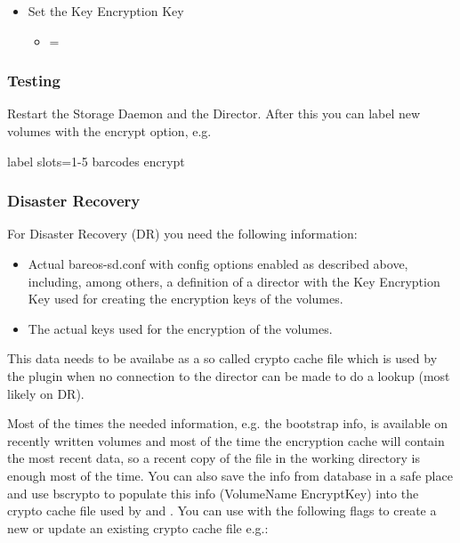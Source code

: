 \begin{itemize}
 \item Set the Key Encryption Key
   \begin{itemize}
   \item {} = 
   \end{itemize}
\end{itemize}

\subsubsection{Testing}

Restart the Storage Daemon and the Director.
After this you can label new volumes with the encrypt option, e.g.
\begin{bconfig}{}
label slots=1-5 barcodes encrypt
\end{bconfig}


\subsubsection{Disaster Recovery}

For Disaster Recovery (DR) you need the following information:

\begin{itemize}
 \item Actual bareos-sd.conf with config options enabled as described above, including, among others, a definition of a director with the Key Encryption Key used for creating the encryption keys of the volumes.
 \item The actual keys used for the encryption of the volumes.
\end{itemize}

This data needs to be availabe as a so called crypto cache file which is used by the plugin when no connection to the director can be made to do a lookup (most likely on DR).

Most of the times the needed information, e.g. the bootstrap info, is available on recently written volumes and most of the time the encryption cache will contain the most recent data, so a recent copy of the  file in the working directory is enough most of the time. You can also save the info from database in a safe place and use bscrypto to populate this info 
(VolumeName \textrightarrow EncryptKey) into the crypto cache file used by  and .
You can use  with the following flags to create a new or update an existing crypto cache file e.g.:

